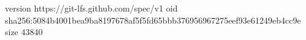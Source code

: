 version https://git-lfs.github.com/spec/v1
oid sha256:5084b4001bea9ba8197678af5f5fd65bbb376956967275eef93e61249eb4cc9e
size 43840
